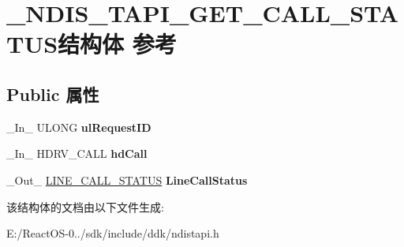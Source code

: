 \hypertarget{struct___n_d_i_s___t_a_p_i___g_e_t___c_a_l_l___s_t_a_t_u_s}{}\section{\+\_\+\+N\+D\+I\+S\+\_\+\+T\+A\+P\+I\+\_\+\+G\+E\+T\+\_\+\+C\+A\+L\+L\+\_\+\+S\+T\+A\+T\+U\+S结构体 参考}
\label{struct___n_d_i_s___t_a_p_i___g_e_t___c_a_l_l___s_t_a_t_u_s}
\subsection*{Public 属性}
\begin{DoxyCompactItemize}
\item 
\mbox{\label{struct___n_d_i_s___t_a_p_i___g_e_t___c_a_l_l___s_t_a_t_u_s_af56501ea377407fdc55830f8a30ee97c}} 
\+\_\+\+In\+\_\+ U\+L\+O\+NG {\bfseries ul\+Request\+ID}
\item 
\mbox{\label{struct___n_d_i_s___t_a_p_i___g_e_t___c_a_l_l___s_t_a_t_u_s_a290959dcfe1fb09019039e26595819c4}} 
\+\_\+\+In\+\_\+ H\+D\+R\+V\+\_\+\+C\+A\+LL {\bfseries hd\+Call}
\item 
\mbox{\label{struct___n_d_i_s___t_a_p_i___g_e_t___c_a_l_l___s_t_a_t_u_s_a38a952cd9ced3115552364fef3da4a1e}} 
\+\_\+\+Out\+\_\+ \hyperlink{struct___l_i_n_e___c_a_l_l___s_t_a_t_u_s}{L\+I\+N\+E\+\_\+\+C\+A\+L\+L\+\_\+\+S\+T\+A\+T\+US} {\bfseries Line\+Call\+Status}
\end{DoxyCompactItemize}


该结构体的文档由以下文件生成\+:\begin{DoxyCompactItemize}
\item 
E\+:/\+React\+O\+S-\/0../sdk/include/ddk/ndistapi.\+h\end{DoxyCompactItemize}
